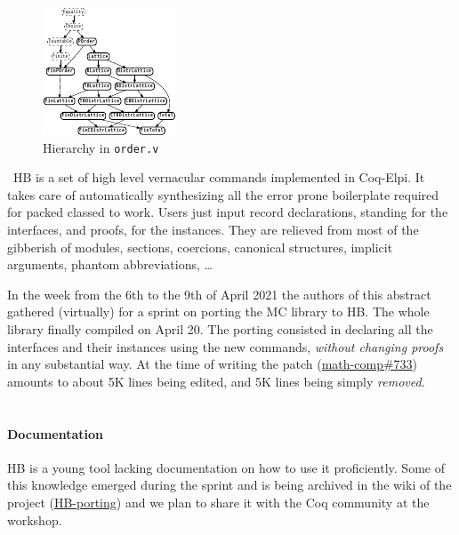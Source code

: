 \documentclass{easychair}
\def\MC{{\sf MC}}
\def\HB{{\sf HB}}
\begin{document}
\begin{figure}
  \vspace{-1em}
	\includegraphics[width=.35\textwidth]{order.pdf}
  \caption{\small Hierarchy in {\tt order.v}}
	\label{fig:order}

\end{figure}
\
\HB{} is a set of high level vernacular commands implemented in Coq-Elpi. It takes
care of automatically synthesizing all the error prone boilerplate required for
packed classed to work. Users just input record declarations,
standing for the interfaces, and proofs, for the instances.
They are relieved from
most of the gibberish of modules, sections, coercions, canonical
structures, implicit arguments, phantom abbreviations, \ldots

In the week from the 6th to the 9th of April 2021 the authors of this abstract
gathered (virtually) for a sprint on porting the \MC{} library to
\HB{}. The whole library finally compiled on April 20.
The porting consisted in declaring all the interfaces and their instances
using the new commands, \emph{without changing proofs} in any substantial way.
At the time of writing the patch (\href{https://github.com/math-comp/math-comp/pull/733}{math-comp\#733})
amounts to about 5K lines being edited, and 5K lines being simply \emph{removed}.\\
\
\paragraph{Documentation}
\HB{} is a young tool lacking documentation
on how to use it proficiently. Some of this knowledge emerged
during the sprint and is being archived in the wiki of the project
(\href{https://github.com/math-comp/math-comp/wiki/HB-porting}{HB-porting}) and we
plan to share it with the Coq community at the workshop.
\end{document}

